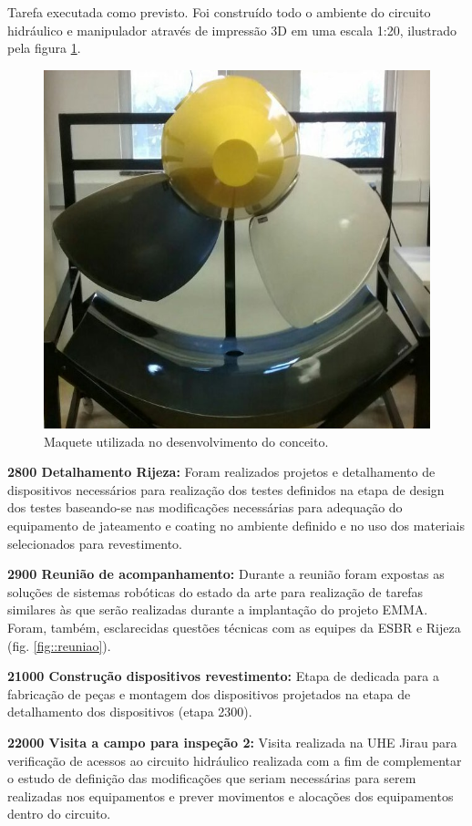 Tarefa executada como previsto. Foi construído todo o ambiente do circuito
hidráulico e manipulador através de impressão 3D em uma escala 1:20, ilustrado
pela figura \ref{fig::maquete}.

\begin{figure}[h!]
\centering
\includegraphics[width=0.6\columnwidth]{figs/maquete}
\caption{Maquete utilizada no desenvolvimento do conceito.}
\label{fig::maquete}
\end{figure} 

  
\noindent
\textbf{2800 Detalhamento Rijeza:} Foram realizados projetos e detalhamento de
dispositivos necessários para realização dos testes definidos na etapa de
design dos testes baseando-se nas modificações necessárias para adequação do
equipamento de jateamento e coating no ambiente definido e no uso dos materiais
selecionados para revestimento.

\noindent
\textbf{2900 Reunião de acompanhamento:} Durante a reunião foram expostas as
soluções de sistemas robóticas do estado da arte para realização de tarefas
similares às que serão realizadas durante a implantação	do projeto EMMA. Foram,
também, esclarecidas questões técnicas com as equipes da ESBR e Rijeza (fig.
\ref{fig::reuniao}).

\noindent
\textbf{21000 Construção dispositivos revestimento:} Etapa de dedicada para a
fabricação de peças e montagem dos dispositivos projetados na etapa de
detalhamento dos dispositivos (etapa 2300).


\noindent
\textbf{22000 Visita a campo para inspeção 2:} Visita realizada na UHE Jirau
para verificação de acessos ao circuito hidráulico realizada com a fim de
complementar o estudo de definição das modificações que seriam necessárias para
serem realizadas nos equipamentos e prever movimentos e alocações dos
equipamentos dentro do circuito.


